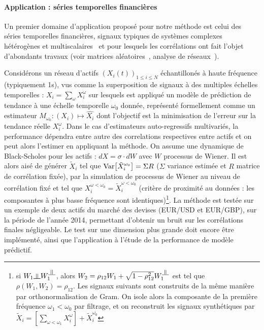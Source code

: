 \vspace{-0.4cm}
\paragraph{Application : séries temporelles financières}

Un premier domaine d'application proposé pour notre méthode est celui des séries temporelles financières, signaux typiques de systèmes complexes hétérogènes et multiscalaires~\cite{mantegna2000introduction} et pour lesquels les corrélations ont fait l'objet d'abondants travaux (voir matrices aléatoires~\cite{2009arXiv0910.1205B}, analyse de réseaux~\cite{tumminello2005tool}).

Considérons un réseau d'actifs $(X_i(t))_{1\leq i \leq N}$ échantillonés à haute fréquence (typiquement 1s), vus comme la superposition de signaux à des multiples échelles temporelles : $X_i=\sum_{\omega}{X_i^{\omega}}$ sur lesquels est appliqué un modèle de prédiction de tendance à une échelle temporelle $\omega_0$ donnée, représenté formellement comme un estimateur $M_{\omega_0} : (X_i) \mapsto \hat{X_i}$ dont l'objectif est la minimisation de l'erreur sur la tendance réelle $X_i^{\omega}$. Dans le cas d'estimateurs auto-regressifs multivariés, la performance dépendra entre autre des correlations respectives entre actifs et on peut alors l'estimer en appliquant la méthode. On assume une dynamique de Black-Scholes pour les actifs : $dX = \sigma\cdot dW$ avec $W$ processus de Wiener. Il est alors aisé de générer $\tilde{X}_i$ tel que $\operatorname{Var}\!\left[\tilde{X}_i^{\omega_0}\right]=\Sigma R$ ($\Sigma$ variance estimée et $R$ matrice de corrélation fixée), par la simulation de processus de Wiener au niveau de corrélation fixé et tel que $X_i^{\omega < \omega_0} = \tilde{X}_i^{\omega < \omega_0}$ (critère de proximité au données : les composantes à plus basse fréquence sont identiques)\footnote{si $W_1 \indep W_1^{\indep}$, alors $W_2 = \rho_{12}W_1 + \sqrt{1-\rho_{12}^2}W_1^{\indep}$ est tel que $\rho(W_1,W_2)=\rho_{12}$. Les signaux suivants sont construits de la même manière par orthonormalisation de Gram. On isole alors la composante de la première fréquence $\omega_1 < \omega_0$ par filtrage, et on reconstruit les signaux synthétiques par $\tilde{X}_i = [\sum_{\omega<\omega_1}X_i^{\omega}]+\tilde{X}_i^{\omega_0}$}. La méthode est testée sur un exemple de deux actifs du marché des devises (EUR/USD et EUR/GBP), sur la période de l'année 2014, permettant d'obtenir un bruit sur les corrélations finales négligeable. Le test sur une dimension plus grande doit encore être implémenté, ainsi que l'application à l'étude de la performance de modèle prédictif.



